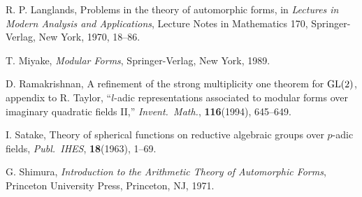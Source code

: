 \begin{enumerate}[label={[\arabic*]},leftmargin=2.8em,itemsep=0.35em,topsep=0.4em]
\item R. P. Langlands, Problems in the theory of automorphic forms, in \emph{Lectures in Modern Analysis and Applications}, Lecture Notes in Mathematics 170, Springer-Verlag, New York, 1970, 18--86.
\item T. Miyake, \emph{Modular Forms}, Springer-Verlag, New York, 1989.
\item D. Ramakrishnan, A refinement of the strong multiplicity one theorem for $\mathrm{GL}(2)$, appendix to R. Taylor, “$l$-adic representations associated to modular forms over imaginary quadratic fields II,” \emph{Invent.\ Math.}, \textbf{116}(1994), 645--649.
\item I. Satake, Theory of spherical functions on reductive algebraic groups over $p$-adic fields, \emph{Publ.\ IHES}, \textbf{18}(1963), 1--69.
\item G. Shimura, \emph{Introduction to the Arithmetic Theory of Automorphic Forms}, Princeton University Press, Princeton, NJ, 1971.
\end{enumerate}
